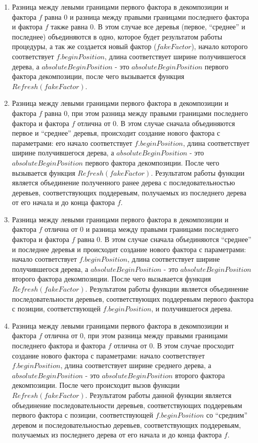 \documentclass[12pt,a4paper]{extarticle}
\theoremstyle{break}
\begin{document}
\begin{enumerate}
\item Разница между левыми границами первого фактора в декомпозиции и фактора
$f$ равна 0 и разница между правыми границами последнего фактора и фактора
$f$ также равна 0. В этом случае все деревья (первое, ``среднее'' и последнее)
объединяются в одно, которое будет результатом работы процедуры, а так же
создается новый фактор ($fakeFactor$), начало которого соответствует
$f.beginPosition$, длина соответствует ширине получившегося дерева, а
$absoluteBeginPosition$ - это $absoluteBeginPosition$ первого фактора
декомпозиции, после чего вызывается функция $Refresh(fakeFactor)$.
\item Разница между левыми границами первого фактора в декомпозиции и фактора
$f$ равна 0, при этом разница между правыми границами последнего фактора и
фактора $f$ отлична от 0. В этом случае сначала объединяются первое и
``среднее'' деревья, происходит создание нового фактора с параметрами: его
начало соответствует $f.beginPosition$, длина соответствует ширине получившегося
дерева, а $absoluteBeginPosition$ - это $absoluteBeginPosition$ первого фактора
декомпозиции. После чего вызывается функция $Refresh(fakeFactor)$. Результатом
работы функции является объединение полученного ранее дерева с
последовательностью деревьев, соответствующих поддеревьям, получаемых из
последнего дерева от его начала и до конца фактора $f$.
\item Разница между левыми границами первого фактора в декомпозиции и фактора
$f$ отлична от 0 и разница между правыми границами последнего фактора и фактора
$f$ равна 0. В этом случае сначала объединяются ``среднее'' и последнее деревья
и происходит создание нового фактора с параметрами: начало соответствует
$f.beginPosition$, длина соответствует ширине получившегося дерева, а
$absoluteBeginPosition$ - это $absoluteBeginPosition$ второго фактора
декомпозиции. После чего вызывается функция $Refresh(fakeFactor)$. Результатом
работы функции является объединение последовательности деревьев, соответствующих
поддеревьям первого фактора с позиции, соответствующей $f.beginPosition$, и
получившегося дерева.
\item Разница между левыми границами первого фактора в декомпозиции и фактора
$f$ отлична от 0, при этом разница между правыми границами последнего фактора и
фактора $f$ отлична от 0. В этом случае просходит создание нового фактора с
параметрами: начало соответствует $f.beginPosition$, длина соответствует ширине
среднего дерева, а $absoluteBeginPosition$ - это $absoluteBeginPosition$ второго
фактора декомпозиции. После чего происходит вызов функции $Refresh(fakeFactor)$.
Результатом работы данной функции является объединение последовательности
деревьев, соответствующих поддеревьям первого фактора с позиции, соответствующей
$f.beginPosition$ со ``средним'' деревом и последовательностью деревьев,
соответствующих поддеревьям, получаемых из последнего дерева от его начала и до
конца фактора $f$.
\end{enumerate}
\end{document}
